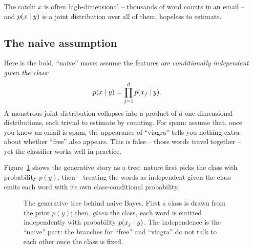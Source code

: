 The catch: $x$ is often high-dimensional -- thousands of word counts in an email --
and $p(x\mid y)$ is a joint distribution over all of them, hopeless to estimate.

\subsection{The naive assumption}

Here is the bold, ``naive'' move: assume the features are
\emph{conditionally independent given the class}:
\[
  p(x\mid y) = \prod_{j=1}^d p(x_j \mid y).
\]
A monstrous joint distribution collapses into a product of $d$ one-dimensional
distributions, each trivial to estimate by counting. For spam: assume that, once
you know an email is spam, the appearance of ``viagra'' tells you nothing extra
about whether ``free'' also appears. This is false -- those words travel together --
yet the classifier works well in practice.

Figure~\ref{ch34:fig-nbtree} shows the generative story as a tree: nature first
picks the class with probability $p(y)$, then -- treating the words as
independent given the class -- emits each word with its own class-conditional
probability.

\begin{figure}[H]
\centering
{}
\caption{The generative tree behind naive Bayes. First a class is drawn from the
prior $p(y)$; then, \emph{given} the class, each word is emitted independently
with probability $p(x_j\mid y)$. The independence is the ``naive'' part: the
branches for ``free'' and ``viagra'' do not talk to each other once the class is
fixed.}
\label{ch34:fig-nbtree}
\end{figure}

